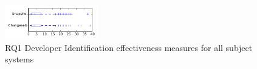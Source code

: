 
\begin{figure}[t]
\centering
\includegraphics[width=0.36\textwidth]{figures/dit/rq1_tiny}
\caption{RQ1 Developer Identification effectiveness measures for all subject systems}
\label{fig:dit:rq1:tiny}
\end{figure}
